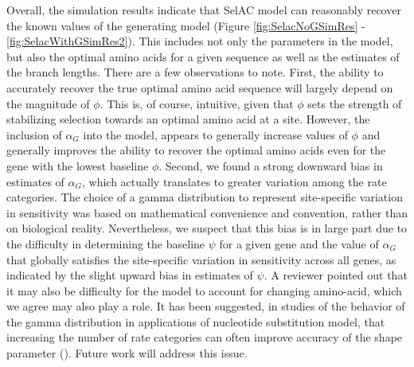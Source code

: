 \documentclass[12pt,letterpaper]{article}
\newcommand{\alphag}{\ensuremath{\alpha_G}\xspace}
\begin{document}
Overall, the simulation results indicate that SelAC model can reasonably recover the known values of the generating model (Figure \ref{fig:SelacNoGSimRes} - \ref{fig:SelacWithGSimRes2}).
This includes not only the parameters in the model, but also the optimal amino acids for a given sequence as well as the estimates of the branch lengths.
There are a few observations to note.
First, the ability to accurately recover the true optimal amino acid sequence will largely depend on the magnitude of $\phi$.
This is, of course, intuitive, given that $\phi$ sets the strength of stabilizing selection towards an optimal amino acid at a site.
However, the inclusion of $\alphag$ into the model, appears to generally increase values of $\phi$ and generally improves the ability to recover the optimal amino acids even for the gene with the lowest baseline $\phi$.
Second, we found a strong downward bias in estimates of $\alphag$, which actually translates to greater variation among the rate categories.
The choice of a gamma distribution to represent site-specific variation in sensitivity was based on mathematical convenience and convention, rather than on biological reality.
Nevertheless, we suspect that this bias is in large part due to the difficulty in determining the baseline $\psi$ for a given gene and the value of $\alphag$ that globally satisfies the site-specific variation in sensitivity across all genes, as indicated by the slight upward bias in estimates of $\psi$.
A reviewer pointed out that it may also be difficulty for the model to account for changing amino-acid, which we agree may also play a role.
It has been suggested, in studies of the behavior of the gamma distribution in applications of nucleotide substitution model, that increasing the number of rate categories can often improve accuracy of the shape parameter (\citet{MayroseEtAl2005}).
Future work will address this issue.
\end{document}
